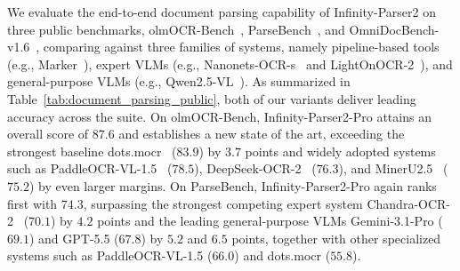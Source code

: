 We evaluate the end-to-end document parsing capability of Infinity-Parser2 on three public benchmarks, olmOCR-Bench~\cite{poznanski2025olmocr}, ParseBench~\cite{zhang2026parsebenchdocumentparsingbenchmark}, and OmniDocBench-v1.6~\cite{ouyang2025omnidocbench}, comparing against three families of systems, namely pipeline-based tools (e.g., Marker~\cite{paruchuri2024marker}), expert VLMs (e.g., Nanonets-OCR-s~\cite{nanonets2025ocrs} and LightOnOCR-2~\cite{taghadouini2026lightonocr}), and general-purpose VLMs (e.g., Qwen2.5-VL~\cite{bai2025qwen25vl}). As summarized in Table~\ref{tab:document_parsing_public}, both of our variants deliver leading accuracy across the suite. On olmOCR-Bench, Infinity-Parser2-Pro attains an overall score of $87.6$ and establishes a new state of the art, exceeding the strongest baseline dots.mocr~\cite{zheng2026multimodalocrparsedocuments} ($83.9$) by $3.7$ points and widely adopted systems such as PaddleOCR-VL-1.5~\cite{cui2025paddleocr} ($78.5$), DeepSeek-OCR-2~\cite{wei2026deepseek2} ($76.3$), and MinerU2.5~\cite{niu2025mineru2} ($75.2$) by even larger margins. On ParseBench, Infinity-Parser2-Pro again ranks first with $74.3$, surpassing the strongest competing expert system Chandra-OCR-2~\cite{datalab2026chandra} ($70.1$) by $4.2$ points and the leading general-purpose VLMs Gemini-3.1-Pro ($69.1$) and GPT-5.5 ($67.8$) by $5.2$ and $6.5$ points, together with other specialized systems such as PaddleOCR-VL-1.5 ($66.0$) and dots.mocr ($55.8$).

